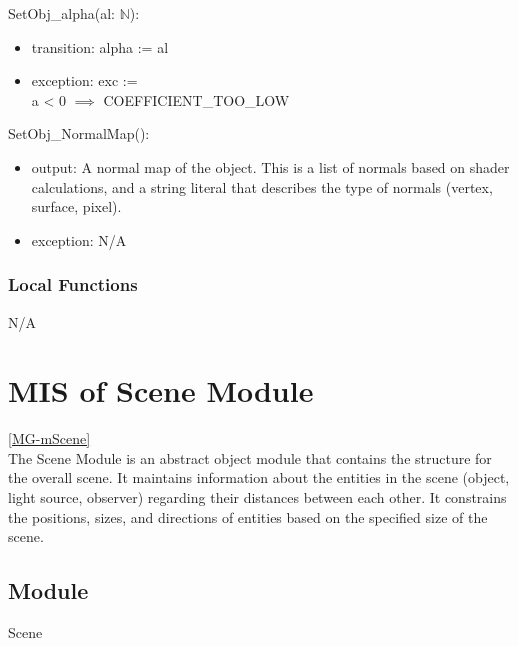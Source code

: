 \documentclass[12pt, titlepage]{article}
\begin{document}
\noindent SetObj\_alpha(al: $\mathbb{N}$):
\begin{itemize}
	\item transition: alpha := al
	\item exception: exc := {\\
		a < 0 $\implies$ COEFFICIENT\_TOO\_LOW\\}
\end{itemize}

\noindent SetObj\_NormalMap():
\begin{itemize}
	\item output: A normal map of the object. This is a list of normals based 
	on shader calculations, and a string literal that describes the type of 
	normals (vertex, surface, pixel).
	\item exception: N/A
\end{itemize}

\subsubsection{Local Functions}
N/A

\newpage

\section{MIS of Scene Module} \ref{MG-mScene} \\
The Scene Module is an abstract object module that contains the structure for 
the overall scene. It maintains information about the entities in the scene 
(object, light source, observer) regarding their distances between each other. 
It constrains the positions, sizes, and directions of entities based on the 
specified size of the scene.
%
%

\subsection{Module}
Scene
\end{document}
